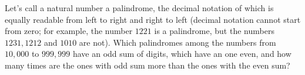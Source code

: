 Let's call a natural number a palindrome, the decimal notation of which is equally readable from left to right and right to left (decimal notation cannot start from zero; for example, the number $1221$ is a palindrome, but the numbers $1231, 1212$ and $1010$ are not). Which palindromes among the numbers from $10,000$ to $999,999$ have an odd sum of digits, which have an one even, and how many times are the ones with odd sum more than the ones with the even sum?